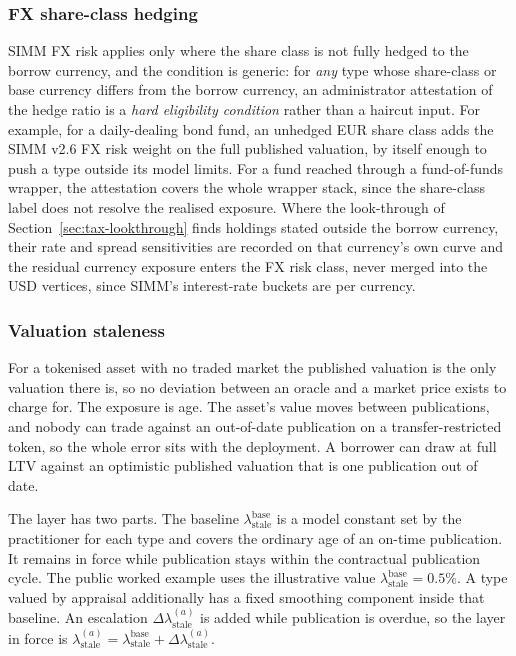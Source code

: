 \subsubsection{FX share-class hedging}
SIMM FX risk applies only where the share class is not fully hedged to the borrow currency, and the condition is generic: for \emph{any} type whose share-class or base currency differs from the borrow currency, an administrator attestation of the hedge ratio is a \emph{hard eligibility condition} rather than a haircut input. For example, for a daily-dealing bond fund, an unhedged EUR share class adds the SIMM v2.6 FX risk weight on the full published valuation, by itself enough to push a type outside its model limits. For a fund reached through a fund-of-funds wrapper, the attestation covers the whole wrapper stack, since the share-class label does not resolve the realised exposure. Where the look-through of Section~\ref{sec:tax-lookthrough} finds holdings stated outside the borrow currency, their rate and spread sensitivities are recorded on that currency's own curve and the residual currency exposure enters the FX risk class, never merged into the USD vertices, since SIMM's interest-rate buckets are per currency.

\subsubsection{Valuation staleness}
For a tokenised asset with no traded market the published valuation is the only valuation there is, so no deviation
between an oracle and a market price exists to charge for. The exposure is age. The asset's value moves between publications, and nobody can trade against an out-of-date publication on
a transfer-restricted token, so the whole error sits with the deployment. A borrower can draw
at full LTV against an optimistic published valuation that is one publication out of date.

The layer has two parts. The baseline $\lambda^{\mathrm{base}}_{\mathrm{stale}}$ is a model
constant set by the practitioner for each type and covers the ordinary age of an on-time
publication. It remains in force while publication stays within the contractual publication
cycle. The public worked example uses the illustrative value
$\lambda^{\mathrm{base}}_{\mathrm{stale}} = 0.5\%$. A type valued by
appraisal additionally has a fixed smoothing component inside that baseline. An escalation
$\Delta\lambda^{(a)}_{\mathrm{stale}}$ is added while publication is overdue, so the layer in
force is $\lambda^{(a)}_{\mathrm{stale}} = \lambda^{\mathrm{base}}_{\mathrm{stale}} +
\Delta\lambda^{(a)}_{\mathrm{stale}}$.

